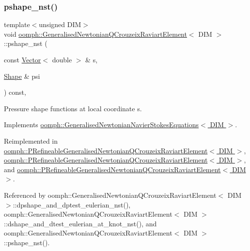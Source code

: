 \subsubsection{\texorpdfstring{pshape\+\_\+nst()}{pshape\_nst()}\hspace{0.1cm}{\footnotesize\ttfamily [1/4]}}
{\footnotesize\ttfamily template$<$unsigned D\+IM$>$ \\
void \hyperlink{classoomph_1_1GeneralisedNewtonianQCrouzeixRaviartElement}{oomph\+::\+Generalised\+Newtonian\+Q\+Crouzeix\+Raviart\+Element}$<$ D\+IM $>$\+::pshape\+\_\+nst (\begin{DoxyParamCaption}\item[{const \hyperlink{classoomph_1_1Vector}{Vector}$<$ double $>$ \&}]{s,  }\item[{\hyperlink{classoomph_1_1Shape}{Shape} \&}]{psi }\end{DoxyParamCaption}) const\hspace{0.3cm}{\ttfamily [inline]}, {\ttfamily [virtual]}}



Pressure shape functions at local coordinate s. 



Implements \hyperlink{classoomph_1_1GeneralisedNewtonianNavierStokesEquations_a84735d21f3d1ade819726a71a7b462e1}{oomph\+::\+Generalised\+Newtonian\+Navier\+Stokes\+Equations$<$ D\+I\+M $>$}.



Reimplemented in \hyperlink{classoomph_1_1PRefineableGeneralisedNewtonianQCrouzeixRaviartElement_a80e3fffb08dc9228fae0535d15cbc096}{oomph\+::\+P\+Refineable\+Generalised\+Newtonian\+Q\+Crouzeix\+Raviart\+Element$<$ D\+I\+M $>$}, \hyperlink{classoomph_1_1PRefineableGeneralisedNewtonianQCrouzeixRaviartElement_a663ff5b7e858c491d8d77649ca555781}{oomph\+::\+P\+Refineable\+Generalised\+Newtonian\+Q\+Crouzeix\+Raviart\+Element$<$ D\+I\+M $>$}, and \hyperlink{classoomph_1_1PRefineableGeneralisedNewtonianQCrouzeixRaviartElement_a08a69865335d8b43be653b21a4ca358f}{oomph\+::\+P\+Refineable\+Generalised\+Newtonian\+Q\+Crouzeix\+Raviart\+Element$<$ D\+I\+M $>$}.



Referenced by oomph\+::\+Generalised\+Newtonian\+Q\+Crouzeix\+Raviart\+Element$<$ D\+I\+M $>$\+::dpshape\+\_\+and\+\_\+dptest\+\_\+eulerian\+\_\+nst(), oomph\+::\+Generalised\+Newtonian\+Q\+Crouzeix\+Raviart\+Element$<$ D\+I\+M $>$\+::dshape\+\_\+and\+\_\+dtest\+\_\+eulerian\+\_\+at\+\_\+knot\+\_\+nst(), and oomph\+::\+Generalised\+Newtonian\+Q\+Crouzeix\+Raviart\+Element$<$ D\+I\+M $>$\+::pshape\+\_\+nst().

